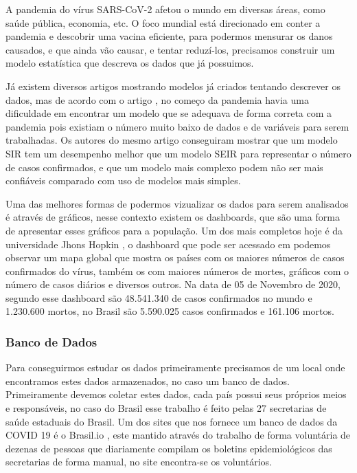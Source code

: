 \documentclass[
  fleqn,ebook]{ic}
\begin{document}
A pandemia do vírus SARS-CoV-2 afetou o mundo em diversas áreas, como saúde
pública, economia, etc. O foco mundial está direcionado em conter a
pandemia e descobrir uma vacina eficiente, para podermos mensurar os danos
causados, e que ainda vão causar, e tentar reduzí-los, precisamos construir um
modelo estatística que descreva os dados que já possuimos.

Já existem diversos artigos mostrando modelos já criados tentando descrever os
dados, mas de acordo com o artigo \citep{roda2020difficult}, no começo da pandemia
havia uma dificuldade em encontrar um modelo que se adequava de forma correta
com a pandemia pois existiam o número muito baixo de dados e de variáveis para
serem trabalhadas. Os autores do mesmo artigo conseguiram mostrar que um modelo
SIR tem um desempenho melhor que um modelo SEIR para representar o número de
casos confirmados, e que um modelo mais complexo podem não ser mais confiáveis
comparado com uso de modelos mais simples.

Uma das melhores formas de podermos vizualizar os dados para serem analisados é
através de gráficos, nesse contexto existem os dashboards, que são uma forma
de apresentar esses gráficos para a população. Um dos mais completos hoje é
da universidade Jhons Hopkin \citep{jhonHopkins}, o dashboard que pode ser acessado
em \citep{jhonHopkinsMap} podemos observar um mapa global que mostra os países com os
maiores números de casos confirmados do vírus, também os com maiores números de
mortes, gráficos com o número de casos diários e diversos outros. Na data de 05
de Novembro de 2020, segundo esse dashboard são 48.541.340 de casos confirmados
no mundo e 1.230.600 mortos, no Brasil são 5.590.025 casos confirmados e
161.106 mortos.

\hypertarget{banco-de-dados}{%
\subsubsection{Banco de Dados}\label{banco-de-dados}}

Para conseguirmos estudar os dados primeiramente precisamos de um local onde
encontramos estes dados armazenados, no caso um banco de dados. Primeiramente
devemos coletar estes dados, cada país possui seus próprios meios e
responsáveis, no caso do Brasil esse trabalho é feito pelas 27 secretarias de
saúde estaduais do Brasil. Um dos sites que nos fornece um banco de dados da
COVID 19 é o Brasil.io \citep{brasil.io}, este mantido através do trabalho de forma
voluntária de dezenas de pessoas que diariamente compilam os boletins
epidemiológicos das secretarias de forma manual, no site \citep{colaboradores}
encontra-se os voluntários.
\end{document}
